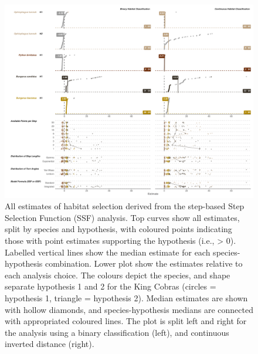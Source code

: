 \documentclass[10pt,a4paper]{article}
\begin{document}
\begin{figure}
\includegraphics[width=1\linewidth]{../../figures/specCurve_ssf} \caption{All estimates of habitat selection derived from the step-based Step Selection Function (SSF) analysis. Top curves show all estimates, split by species and hypothesis, with coloured points indicating those with point estimates supporting the hypothesis (i.e., > 0). Labelled vertical lines show the median estimate for each species-hypothesis combination. Lower plot show the estimates relative to each analysis choice. The colours depict the species, and shape separate hypothesis 1 and 2 for the King Cobras (circles = hypothesis 1, triangle = hypothesis 2). Median estimates are shown with hollow diamonds, and species-hypothesis medians are connected with appropriated coloured lines. The plot is split left and right for the analysis using a binary classification (left), and continuous inverted distance (right).}\label{fig:specCurveSsf}
\end{figure}
\end{document}
